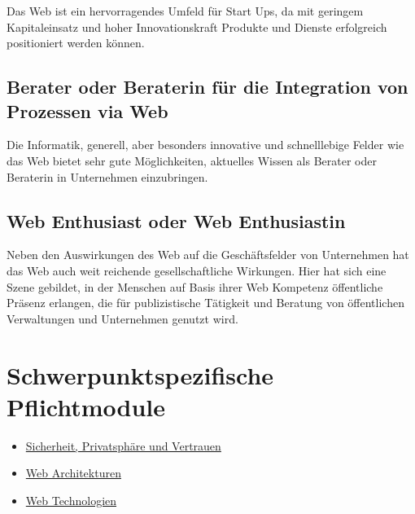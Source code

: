 Das Web ist ein hervorragendes Umfeld für Start Ups, da mit geringem
Kapitaleinsatz und hoher Innovationskraft Produkte und Dienste
erfolgreich positioniert werden können.

\subsection*{Berater oder Beraterin für die Integration von Prozessen
via
Web\label{/mi-2017/modulbeschreibungen-master/schwerpunkt-weaving-the-web}}\label{berater-oder-beraterin-fuxfcr-die-integration-von-prozessen-via-webpathlabelmi-2017modulbeschreibungen-masterschwerpunkt-weaving-the-web}

Die Informatik, generell, aber besonders innovative und schnelllebige
Felder wie das Web bietet sehr gute Möglichkeiten, aktuelles Wissen als
Berater oder Beraterin in Unternehmen einzubringen.

\subsection*{Web Enthusiast oder Web
Enthusiastin\label{/mi-2017/modulbeschreibungen-master/schwerpunkt-weaving-the-web}}\label{web-enthusiast-oder-web-enthusiastinpathlabelmi-2017modulbeschreibungen-masterschwerpunkt-weaving-the-web}

Neben den Auswirkungen des Web auf die Geschäftsfelder von Unternehmen
hat das Web auch weit reichende gesellschaftliche Wirkungen. Hier hat
sich eine Szene gebildet, in der Menschen auf Basis ihrer Web Kompetenz
öffentliche Präsenz erlangen, die für publizistische Tätigkeit und
Beratung von öffentlichen Verwaltungen und Unternehmen genutzt wird.

\section*{Schwerpunktspezifische
Pflichtmodule\label{/mi-2017/modulbeschreibungen-master/schwerpunkt-weaving-the-web}}\label{schwerpunktspezifische-pflichtmodulepathlabelmi-2017modulbeschreibungen-masterschwerpunkt-weaving-the-web}

\begin{itemize}
\tightlist
\item
  \hyperref[/mi-2017/modulbeschreibungen-master/MA_WTW_Modul_IT-Sicherheit]{Sicherheit,
  Privatsphäre und Vertrauen}
\item
  \hyperref[/mi-2017/modulbeschreibungen-master/MA_WTW_Modul_Web-Architekturen]{Web
  Architekturen}
\item
  \hyperref[/mi-2017/modulbeschreibungen-master/MA_WTW_Modul_Web-Technologien]{Web
  Technologien}
\end{itemize}

